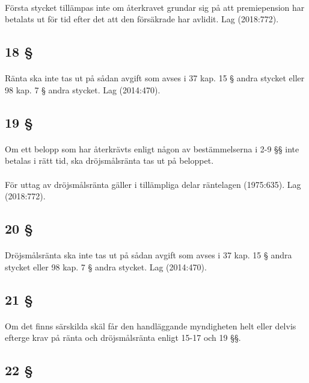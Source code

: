 \documentclass[a4paper,notitlepage,openany,10pt]{book}
\begin{document}
\paragraph*{}
Första stycket tillämpas inte om återkravet grundar sig på att premiepension har betalats ut för tid efter det att den försäkrade har avlidit.
Lag (2018:772).
\subsection*{18 §}
\paragraph*{}
Ränta ska inte tas ut på sådan avgift som avses i 37 kap. 15 § andra stycket eller 98 kap. 7 § andra stycket.
Lag (2014:470).
\subsection*{19 §}
\paragraph*{}
Om ett belopp som har återkrävts enligt någon av bestämmelserna i 2-9 §§ inte betalas i rätt tid, ska dröjsmålsränta tas ut på beloppet.
\paragraph*{}
För uttag av dröjsmålsränta gäller i tillämpliga delar räntelagen (1975:635).
Lag (2018:772).
\subsection*{20 §}
\paragraph*{}
Dröjsmålsränta ska inte tas ut på sådan avgift som avses i 37 kap. 15 § andra stycket eller 98 kap. 7 § andra stycket.
Lag (2014:470).
\subsection*{21 §}
\paragraph*{}
Om det finns särskilda skäl får den handläggande myndigheten helt eller delvis efterge krav på ränta och dröjsmålsränta enligt 15-17 och 19 §§.
\subsection*{22 §}
\end{document}
